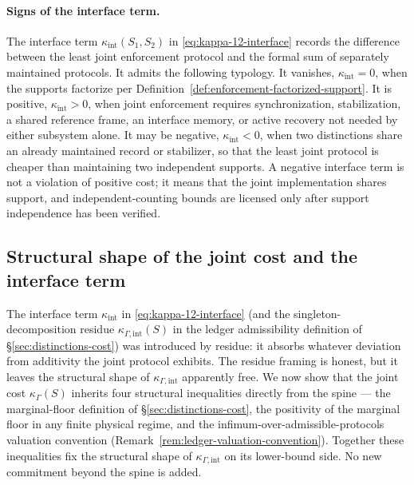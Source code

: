 \documentclass[11pt]{article}
\begin{document}
\paragraph{Signs of the interface term.}
The interface term $\kappa_{\mathrm{int}}(S_1,S_2)$ in
\eqref{eq:kappa-12-interface} records the difference between the
least joint enforcement protocol and the formal sum of separately
maintained protocols.  It admits the following typology.  It vanishes,
$\kappa_{\mathrm{int}}=0$, when the supports factorize per
Definition~\ref{def:enforcement-factorized-support}.  It is positive,
$\kappa_{\mathrm{int}}>0$, when joint enforcement requires
synchronization, stabilization, a shared reference frame, an
interface memory, or active recovery not needed by either subsystem
alone.  It may be negative, $\kappa_{\mathrm{int}}<0$, when two
distinctions share an already maintained record or stabilizer, so
that the least joint protocol is cheaper than maintaining two
independent supports.  A negative interface term is not a violation
of positive cost; it means that the joint implementation shares
support, and independent-counting bounds are licensed only after
support independence has been verified.

\subsection*{Structural shape of the joint cost and the interface term}

The interface term $\kappa_{\mathrm{int}}$ in \eqref{eq:kappa-12-interface} (and the singleton-decomposition residue $\kappa_{\Gamma,\mathrm{int}}(S)$ in the ledger admissibility definition of \S\ref{sec:distinctions-cost}) was introduced by residue: it absorbs whatever deviation from additivity the joint protocol exhibits.  The residue framing is honest, but it leaves the structural shape of $\kappa_{\Gamma,\mathrm{int}}$ apparently free.  We now show that the joint cost $\kappa_\Gamma(S)$ inherits four structural inequalities directly from the spine --- the marginal-floor definition of \S\ref{sec:distinctions-cost}, the positivity of the marginal floor in any finite physical regime, and the infimum-over-admissible-protocols valuation convention (Remark~\ref{rem:ledger-valuation-convention}).  Together these inequalities fix the structural shape of $\kappa_{\Gamma,\mathrm{int}}$ on its lower-bound side.  No new commitment beyond the spine is added.
\end{document}
